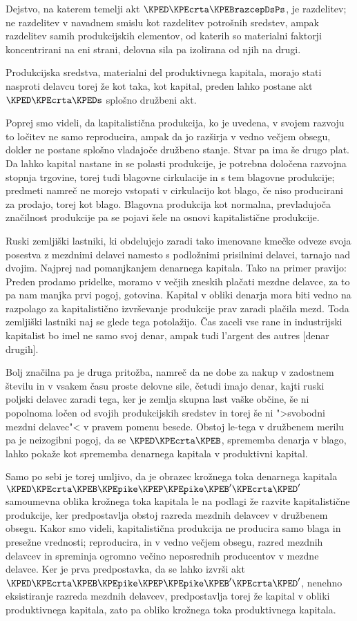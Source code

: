 \documentclass[kapital_02.tex]{subfiles}
\begin{document}
Dejstvo, na katerem temelji akt \(\KPED\KPEcrta\KPEBrazcepDsPs\), je razdelitev; ne razdelitev v navadnem smislu kot razdelitev potrošnih sredstev, ampak razdelitev samih produkcijskih elementov, od katerih so materialni faktorji koncentrirani na eni strani, delovna sila pa izolirana od njih na drugi.

Produkcijska sredstva, materialni del produktivnega kapitala, morajo stati nasproti delavcu torej že kot taka, kot kapital, preden lahko postane akt \(\KPED\KPEcrta\KPEDs\) splošno družbeni akt.

Poprej smo videli, da kapitalistična produkcija, ko je uvedena, v svojem razvoju to ločitev ne samo reproducira, ampak da jo razširja v vedno večjem obsegu, dokler ne postane splošno vladajoče družbeno stanje. Stvar pa ima še drugo plat. Da lahko kapital nastane in se polasti produkcije, je potrebna določena razvojna stopnja trgovine, torej tudi blagovne cirkulacije in s tem blagovne produkcije; predmeti namreč ne morejo vstopati v cirkulacijo kot blago, če niso producirani za prodajo, torej kot blago. Blagovna produkcija kot normalna, prevladujoča značilnost produkcije pa se pojavi šele na osnovi kapitalistične produkcije.

Ruski zemljiški lastniki, ki obdelujejo zaradi tako imenovane kmečke odveze svoja posestva z mezdnimi delavci namesto \KPEstran s podložnimi prisilnimi delavci, tarnajo nad dvojim. Najprej nad pomanjkanjem denarnega kapitala. Tako na primer pravijo: Preden prodamo pridelke, moramo v večjih zneskih plačati mezdne delavce, za to pa nam manjka prvi pogoj, gotovina. Kapital v obliki denarja mora biti vedno na razpolago za kapitalistično izvrševanje produkcije prav zaradi plačila mezd. Toda zemljiški lastniki naj se glede tega potolažijo. Čas zaceli vse rane in industrijski kapitalist bo imel ne samo svoj denar, ampak tudi l'argent des autres [denar drugih].

Bolj značilna pa je druga pritožba, namreč da ne dobe za nakup v zadostnem številu in v vsakem času proste delovne sile, četudi imajo denar, kajti ruski poljski delavec zaradi tega, ker je zemlja skupna last vaške občine, še ni popolnoma ločen od svojih produkcijskih sredstev in torej še ni ">svobodni mezdni delavec"< v pravem pomenu besede. Obstoj le-tega v družbenem merilu pa je neizogibni pogoj, da se \(\KPED\KPEcrta\KPEB\), sprememba denarja v blago, lahko pokaže kot sprememba denarnega kapitala v produktivni kapital.

Samo po sebi je torej umljivo, da je obrazec krožnega toka denarnega kapitala \(\KPED\KPEcrta\KPEB\KPEpike\KPEP\KPEpike\KPEB'\KPEcrta\KPED'\) samoumevna oblika krožnega toka kapitala le na podlagi že razvite kapitalistične produkcije, ker predpostavlja obstoj razreda mezdnih delavcev v družbenem obsegu. Kakor smo videli, kapitalistična produkcija ne producira samo blaga in presežne vrednosti; reproducira, in v vedno večjem obsegu, razred mezdnih delavcev in spreminja ogromno večino neposrednih producentov v mezdne delavce. Ker je prva predpostavka, da se lahko izvrši akt \(\KPED\KPEcrta\KPEB\KPEpike\KPEP\KPEpike\KPEB'\KPEcrta\KPED'\), nenehno eksistiranje razreda mezdnih delavcev, predpostavlja torej že kapital v obliki produktivnega kapitala, zato pa obliko krožnega toka produktivnega kapitala.
\end{document}
